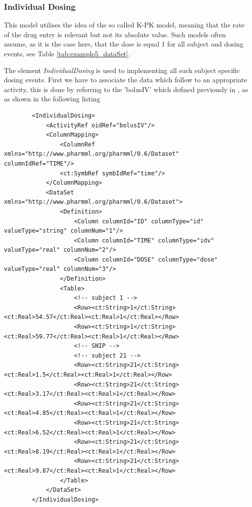 \subsubsection{Individual Dosing}
\label{subsubsec:Ribba_indivDosing}

This model utilises the idea of the so called K-PK model, meaning that the rate of the drug entry is relevant
but not its absolute value. Such models often assume, as it is the case here, that the dose is equal 1
for all subject and dosing events, see Table \ref{tab:example5_dataSet}.

The element \textit{IndividualDosing} is used to implementing all such subject specific
dosing events. First we have to associate the data which follow to an appropriate activity,
this is done by referring to the 'bolusIV' which defined previously in , as 
as shown in the following listing 
\lstset{language=XML}
\begin{lstlisting}
        <IndividualDosing>
            <ActivityRef oidRef="bolusIV"/>
            <ColumnMapping>
                <ColumnRef xmlns="http://www.pharmml.org/pharmml/0.6/Dataset" columnIdRef="TIME"/>
                <ct:SymbRef symbIdRef="time"/>
            </ColumnMapping>
            <DataSet xmlns="http://www.pharmml.org/pharmml/0.6/Dataset">
                <Definition>
                    <Column columnId="ID" columnType="id" valueType="string" columnNum="1"/>
                    <Column columnId="TIME" columnType="idv" valueType="real" columnNum="2"/>
                    <Column columnId="DOSE" columnType="dose" valueType="real" columnNum="3"/>
                </Definition>
                <Table>
                    <!-- subject 1 -->
                    <Row><ct:String>1</ct:String><ct:Real>54.57</ct:Real><ct:Real>1</ct:Real></Row> 
                    <Row><ct:String>1</ct:String><ct:Real>59.77</ct:Real><ct:Real>1</ct:Real></Row> 
                    <!-- SNIP -->
                    <!-- subject 21 -->
                    <Row><ct:String>21</ct:String><ct:Real>1.5</ct:Real><ct:Real>1</ct:Real></Row> 
                    <Row><ct:String>21</ct:String><ct:Real>3.17</ct:Real><ct:Real>1</ct:Real></Row> 
                    <Row><ct:String>21</ct:String><ct:Real>4.85</ct:Real><ct:Real>1</ct:Real></Row> 
                    <Row><ct:String>21</ct:String><ct:Real>6.52</ct:Real><ct:Real>1</ct:Real></Row> 
                    <Row><ct:String>21</ct:String><ct:Real>8.19</ct:Real><ct:Real>1</ct:Real></Row> 
                    <Row><ct:String>21</ct:String><ct:Real>9.87</ct:Real><ct:Real>1</ct:Real></Row> 
                </Table>
            </DataSet>
        </IndividualDosing>
\end{lstlisting}

